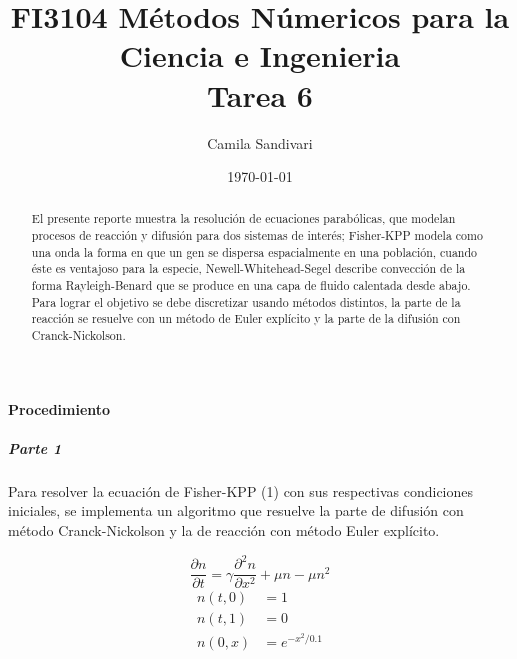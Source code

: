 \documentclass[prl,showpacs]{revtex4-1}
\begin{document}
\title{FI3104 M\'etodos N\'umericos para la Ciencia e Ingenieria\\ Tarea 6}
\author{Camila Sandivari}
\date{\today}

\begin{abstract}
El presente reporte muestra la resoluci\'on de ecuaciones parab\'olicas, que modelan procesos de reacci\'on y difusi\'on para dos sistemas de inter\'es; Fisher-KPP modela como una onda la forma en que un gen se dispersa espacialmente en una poblaci\'on, cuando \'este es ventajoso para la especie, Newell-Whitehead-Segel describe convecci\'on de la forma Rayleigh-Benard que se produce en una capa de fluido calentada desde abajo.
Para lograr el objetivo se debe discretizar usando m\'etodos distintos, la parte de la reacci\'on se resuelve con un m\'etodo de Euler expl\'icito y la parte de la difusi\'on con Cranck-Nickolson. 

\end{abstract}
\maketitle


\paragraph{Procedimiento}
\subparagraph{Parte 1}
Para resolver la ecuaci\'on de Fisher-KPP (1) con sus respectivas condiciones iniciales, se implementa un algoritmo que resuelve la parte de difusi\'on con m\'etodo Cranck-Nickolson y la de reacci\'on con m\'etodo Euler expl\'icito. 

\begin{equation}
\frac{\partial n}{\partial t} = \gamma \frac{\partial^2n}{\partial x^2} + \mu n - \mu n^2
\end{equation}
\begin{eqnarray}
 n(t, 0) &= 1\\ n(t, 1) &= 0\\ n(0, x) &= e^{-x^2/0.1} 
\end{eqnarray}
\end{document}
